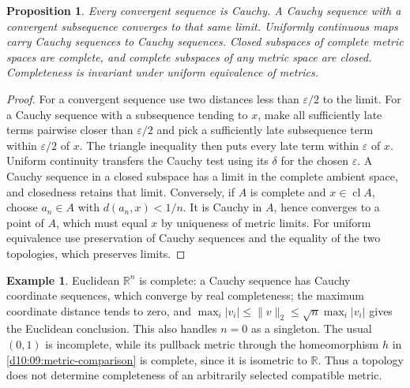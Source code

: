 \documentclass[11pt,oneside,openany]{book}
\newtheorem{proposition}[theorem]{Proposition}
\theoremstyle{definition}
\newtheorem{example}[theorem]{Example}
\theoremstyle{remark}
\newcommand{\R}{\mathbb R}\newcommand{\C}{\mathbb C}
\newcommand{\eps}{\varepsilon}
\DeclareMathOperator{\cl}{cl}
\begin{document}
\begin{proposition}\label{d10:09:cauchy-basics}
Every convergent sequence is Cauchy. A Cauchy sequence with a convergent subsequence converges to that same limit. Uniformly continuous maps carry Cauchy sequences to Cauchy sequences. Closed subspaces of complete metric spaces are complete, and complete subspaces of any metric space are closed. Completeness is invariant under uniform equivalence of metrics.
\end{proposition}
\begin{proof}
For a convergent sequence use two distances less than $\eps/2$ to the limit. For a Cauchy sequence with a subsequence tending to $x$, make all sufficiently late terms pairwise closer than $\eps/2$ and pick a sufficiently late subsequence term within $\eps/2$ of $x$. The triangle inequality then puts every late term within $\eps$ of $x$. Uniform continuity transfers the Cauchy test using its $\delta$ for the chosen $\eps$. A Cauchy sequence in a closed subspace has a limit in the complete ambient space, and closedness retains that limit. Conversely, if $A$ is complete and $x\in\cl A$, choose $a_n\in A$ with $d(a_n,x)<1/n$. It is Cauchy in $A$, hence converges to a point of $A$, which must equal $x$ by uniqueness of metric limits. For uniform equivalence use preservation of Cauchy sequences and the equality of the two topologies, which preserves limits.
\end{proof}

\begin{example}\label{d10:09:complete-examples}
Euclidean $\R^n$ is complete: a Cauchy sequence has Cauchy coordinate sequences, which converge by real completeness; the maximum coordinate distance tends to zero, and $\max_i|v_i|\leq\|v\|_2\leq\sqrt n\max_i|v_i|$ gives the Euclidean conclusion. This also handles $n=0$ as a singleton. The usual $(0,1)$ is incomplete, while its pullback metric through the homeomorphism $h$ in \cref{d10:09:metric-comparison} is complete, since it is isometric to $\R$. Thus a topology does not determine completeness of an arbitrarily selected compatible metric.
\end{example}
\end{document}

